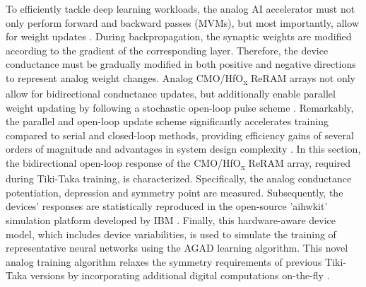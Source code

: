 To efficiently tackle deep learning workloads, the analog AI accelerator must not only perform forward and backward passes (MVMs), but most importantly, allow for weight updates \cite{aihwkit}. During backpropagation, the synaptic weights are modified according to the gradient of the corresponding layer. Therefore, the device conductance must be gradually modified in both positive and negative directions to represent analog weight changes. Analog CMO/HfO\textsubscript{x} ReRAM arrays not only allow for bidirectional conductance updates, but additionally enable parallel weight updating by following a stochastic open-loop pulse scheme \cite{Gokmen2016,Gokmen2020}. Remarkably, the parallel and open-loop update scheme significantly accelerates training compared to serial and closed-loop methods, providing efficiency gains of several orders of magnitude and advantages in system design complexity \cite{Chen2023}. In this section, the bidirectional open-loop response of the CMO/HfO\textsubscript{x} ReRAM array, required during Tiki-Taka training, is characterized. Specifically, the analog conductance potentiation, depression and symmetry point are measured. Subsequently, the devices' responses are statistically reproduced in the open-source 'aihwkit' simulation platform developed by IBM \cite{aihwkit}. Finally, this hardware-aware device model, which includes device variabilities, is used to simulate the training of representative neural networks using the AGAD learning algorithm. This novel analog training algorithm relaxes the symmetry requirements of previous Tiki-Taka versions by incorporating additional digital computations on-the-fly \cite{Rasch2024Agad}.

